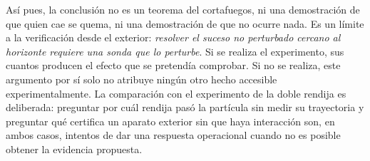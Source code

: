 Así pues, la conclusión no es un teorema del cortafuegos, ni una demostración de que quien cae se quema, ni una demostración de que no ocurre nada. Es un límite a la verificación desde el exterior: \emph{resolver el suceso no perturbado cercano al horizonte requiere una sonda que lo perturbe}.
Si se realiza el experimento, sus cuantos producen el efecto que se pretendía comprobar. Si no se realiza, este argumento por sí solo no atribuye ningún otro hecho accesible experimentalmente. La comparación con el experimento de la doble rendija es deliberada: preguntar por cuál rendija pasó la partícula sin medir su trayectoria y preguntar qué certifica un aparato exterior sin que haya interacción son, en ambos casos, intentos de dar una respuesta operacional cuando no es posible obtener la evidencia propuesta.
